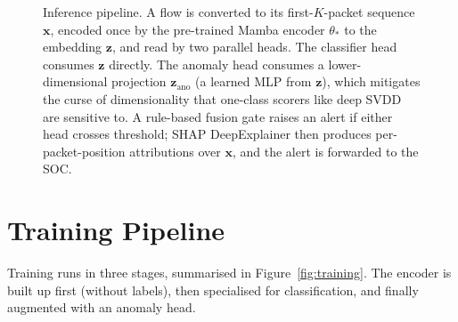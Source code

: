 \documentclass[11pt,a4paper]{article}
\begin{document}
\begin{figure}[H]
\begin{tikzpicture}[node distance=0.55cm and 0.65cm]
\end{tikzpicture}
\caption{Inference pipeline. A flow is converted to its first-$K$-packet sequence $\mathbf{x}$, encoded once by the pre-trained Mamba encoder $\theta_*$ to the embedding $\mathbf{z}$, and read by two parallel heads. The classifier head consumes $\mathbf{z}$ directly. The anomaly head consumes a lower-dimensional projection $\mathbf{z}_\text{ano}$ (a learned MLP from $\mathbf{z}$), which mitigates the curse of dimensionality that one-class scorers like deep SVDD are sensitive to. A rule-based fusion gate raises an alert if either head crosses threshold; SHAP DeepExplainer then produces per-packet-position attributions over $\mathbf{x}$, and the alert is forwarded to the SOC.}
\label{fig:inference}
\end{figure}

\section{Training Pipeline}

Training runs in three stages, summarised in Figure~\ref{fig:training}. The encoder is built up first (without labels), then specialised for classification, and finally augmented with an anomaly head.
\end{document}
